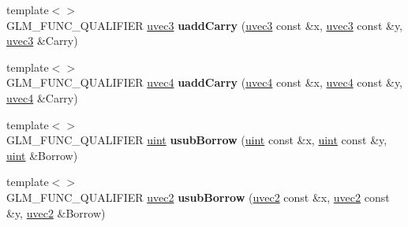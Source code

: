 \begin{DoxyCompactItemize}
\item 
\hypertarget{namespaceglm_a2e6210424a7addf84cdeaf17f583d2da}{{\footnotesize template$<$$>$ }\\G\-L\-M\-\_\-\-F\-U\-N\-C\-\_\-\-Q\-U\-A\-L\-I\-F\-I\-E\-R \hyperlink{group__core__types_gac4ba593917841b859ba1683b8b52b8fa}{uvec3} {\bfseries uadd\-Carry} (\hyperlink{group__core__types_gac4ba593917841b859ba1683b8b52b8fa}{uvec3} const \&x, \hyperlink{group__core__types_gac4ba593917841b859ba1683b8b52b8fa}{uvec3} const \&y, \hyperlink{group__core__types_gac4ba593917841b859ba1683b8b52b8fa}{uvec3} \&Carry)}\label{namespaceglm_a2e6210424a7addf84cdeaf17f583d2da}

\item 
\hypertarget{namespaceglm_af3ad9f57d6e505779a8b35546c31d08b}{{\footnotesize template$<$$>$ }\\G\-L\-M\-\_\-\-F\-U\-N\-C\-\_\-\-Q\-U\-A\-L\-I\-F\-I\-E\-R \hyperlink{group__core__types_ga1c426d19627b32b14f0089f7f4ba7b1d}{uvec4} {\bfseries uadd\-Carry} (\hyperlink{group__core__types_ga1c426d19627b32b14f0089f7f4ba7b1d}{uvec4} const \&x, \hyperlink{group__core__types_ga1c426d19627b32b14f0089f7f4ba7b1d}{uvec4} const \&y, \hyperlink{group__core__types_ga1c426d19627b32b14f0089f7f4ba7b1d}{uvec4} \&Carry)}\label{namespaceglm_af3ad9f57d6e505779a8b35546c31d08b}

\item 
\hypertarget{namespaceglm_a8b489a758eb61d6308ecdf33081da3be}{{\footnotesize template$<$$>$ }\\G\-L\-M\-\_\-\-F\-U\-N\-C\-\_\-\-Q\-U\-A\-L\-I\-F\-I\-E\-R \hyperlink{group__core__precision_ga4fd29415871152bfb5abd588334147c8}{uint} {\bfseries usub\-Borrow} (\hyperlink{group__core__precision_ga4fd29415871152bfb5abd588334147c8}{uint} const \&x, \hyperlink{group__core__precision_ga4fd29415871152bfb5abd588334147c8}{uint} const \&y, \hyperlink{group__core__precision_ga4fd29415871152bfb5abd588334147c8}{uint} \&Borrow)}\label{namespaceglm_a8b489a758eb61d6308ecdf33081da3be}

\item 
\hypertarget{namespaceglm_a5c3c7dfa6a8edab85fce4a945e0dc373}{{\footnotesize template$<$$>$ }\\G\-L\-M\-\_\-\-F\-U\-N\-C\-\_\-\-Q\-U\-A\-L\-I\-F\-I\-E\-R \hyperlink{group__core__types_gafd2041b45eff671aa8899d2c2835eee9}{uvec2} {\bfseries usub\-Borrow} (\hyperlink{group__core__types_gafd2041b45eff671aa8899d2c2835eee9}{uvec2} const \&x, \hyperlink{group__core__types_gafd2041b45eff671aa8899d2c2835eee9}{uvec2} const \&y, \hyperlink{group__core__types_gafd2041b45eff671aa8899d2c2835eee9}{uvec2} \&Borrow)}\label{namespaceglm_a5c3c7dfa6a8edab85fce4a945e0dc373}


\end{DoxyCompactItemize}
